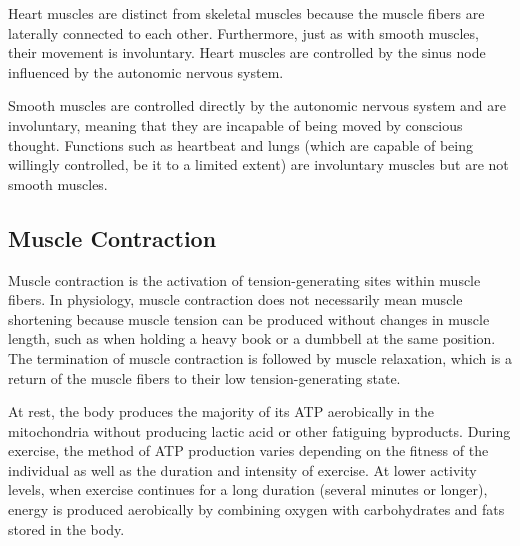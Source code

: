 Heart muscles are distinct from skeletal muscles because the muscle fibers are laterally connected to each other. Furthermore, just as with smooth muscles, their movement is involuntary. Heart muscles are controlled by the sinus node influenced by the autonomic nervous system.

Smooth muscles are controlled directly by the autonomic nervous system and are involuntary, meaning that they are incapable of being moved by conscious thought. Functions such as heartbeat and lungs (which are capable of being willingly controlled, be it to a limited extent) are involuntary muscles but are not smooth muscles.

\hypertarget{muscle-contraction}{%
\subsection{Muscle Contraction}\label{muscle-contraction}}

Muscle contraction is the activation of tension-generating sites within muscle fibers. In physiology, muscle contraction does not necessarily mean muscle shortening because muscle tension can be produced without changes in muscle length, such as when holding a heavy book or a dumbbell at the same position. The termination of muscle contraction is followed by muscle relaxation, which is a return of the muscle fibers to their low tension-generating state.

At rest, the body produces the majority of its ATP aerobically in the mitochondria without producing lactic acid or other fatiguing byproducts. During exercise, the method of ATP production varies depending on the fitness of the individual as well as the duration and intensity of exercise. At lower activity levels, when exercise continues for a long duration (several minutes or longer), energy is produced aerobically by combining oxygen with carbohydrates and fats stored in the body.

